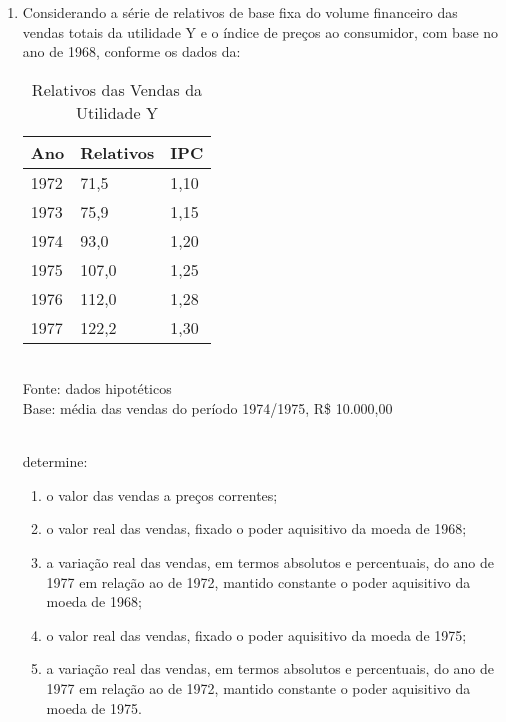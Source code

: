 \begin{enumerate}[resume]
\item Considerando a série de relativos de base fixa do volume financeiro das vendas totais da utilidade Y e o índice de preços ao consumidor, com base no ano de 1968, conforme os dados da:
	\begin{table}[!htb]
	\centering
	\caption{Relativos das Vendas da Utilidade Y}
	\vspace{0.5cm}
	\begin{tabular}{lll}
	Ano & Relativos & IPC \\
	\hline 
	1972 & 71,5 & 1,10  \\
	1973 & 75,9 & 1,15  \\
	1974 & 93,0 & 1,20  \\
	1975 & 107,0 & 1,25  \\	
	1976 & 112,0 & 1,28  \\
	1977 & 122,2 & 1,30  \\			
	\end{tabular}\\
	Fonte: dados hipotéticos\\
	Base: média das vendas do período 1974/1975, R\$ 10.000,00
	\end{table}	
	\\
	determine:	
	\begin{enumerate}
	\item o valor das vendas a preços correntes;
	\item o valor real das vendas, fixado o poder aquisitivo da moeda de 1968;
	\item a variação real das vendas, em termos absolutos e percentuais, do ano de 1977 em relação ao de 1972, mantido constante o poder aquisitivo da moeda de 1968;
	\item o valor real das vendas, fixado o poder aquisitivo da moeda de 1975;
	\item a variação real das vendas, em termos absolutos e percentuais, do ano de 1977 em relação ao de 1972, mantido constante o poder aquisitivo da moeda de 1975.
	\end{enumerate}	


\end{enumerate}